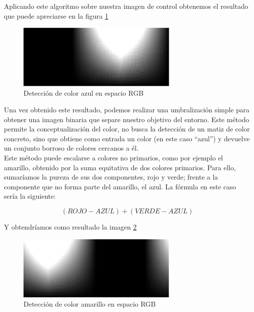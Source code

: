 Aplicando este algoritmo sobre nuestra imagen de control obtenemos el resultado que puede apreciarse en la figura \ref{rgbazul}\\

\begin{figure}[h]
\centering
\includegraphics[width=0.7\textwidth]{images/rgbazul}%
\caption{Detección de color azul en espacio RGB}
\label{rgbazul}
\end{figure}
\FloatBarrier

Una vez obtenido este resultado, podemos realizar una umbralización simple para obtener una imagen binaria que separe nuestro objetivo del entorno. Este método permite la conceptualización del color, no busca la detección de un matiz de color concreto, sino que obtiene como entrada un color (en este caso “azul”) y devuelve un conjunto borroso de colores cercanos a él.\\

Este método puede escalarse a colores no primarios, como por ejemplo el amarillo, obtenido por la suma equitativa de dos colores primarios. Para ello, sumaríamos la pureza de sus dos componentes, rojo y verde; frente a la componente que no forma parte del amarillo, el azul. La fórmula en este caso sería la siguiente:

\[(ROJO - AZUL) + (VERDE - AZUL) \]

Y obtendríamos como resultado la imagen \ref{rgbamarillo}\\

\begin{figure}[h]
\centering
\includegraphics[width=0.7\textwidth]{images/rgbamarillo}%
\caption{Detección de color amarillo en espacio RGB}
\label{rgbamarillo}
\end{figure}
\FloatBarrier

